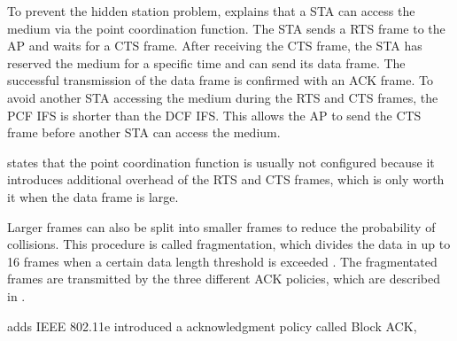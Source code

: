 To prevent the hidden station problem, \textcite{sauter_wireless_2022} explains that a \ac{STA} can access the medium
via the point coordination function.
The \ac{STA} sends a \ac{RTS} frame to the \ac{AP} and waits for a \ac{CTS} frame.
After receiving the \ac{CTS} frame, the \ac{STA} has reserved the medium for a specific time and can send its data frame.
The successful transmission of the data frame is confirmed with an \ac{ACK} frame.
To avoid another \ac{STA} accessing the medium during the \ac{RTS} and \ac{CTS} frames, the \ac{PCF} \ac{IFS} is
shorter than the \ac{DCF} \ac{IFS}.
This allows the \ac{AP} to send the \ac{CTS} frame before another \ac{STA} can access the medium.

\textcite{sauter_wireless_2022} states that the point coordination function is usually not configured because it introduces additional
overhead of the \ac{RTS} and \ac{CTS} frames, which is only worth it when the data frame is large.

Larger frames can also be split into smaller frames to reduce the probability of collisions.
This procedure is called fragmentation, which divides the data in up to \num{16} frames
when a certain data length threshold is exceeded \cite{noauthor_ieee_2021}.
The fragmentated frames are transmitted by the three different \ac{ACK} policies, which are described in \cite{sauter_wireless_2022}.

\textcite{sauter_wireless_2022} adds IEEE 802.11e introduced a acknowledgment policy called Block \ac{ACK},


